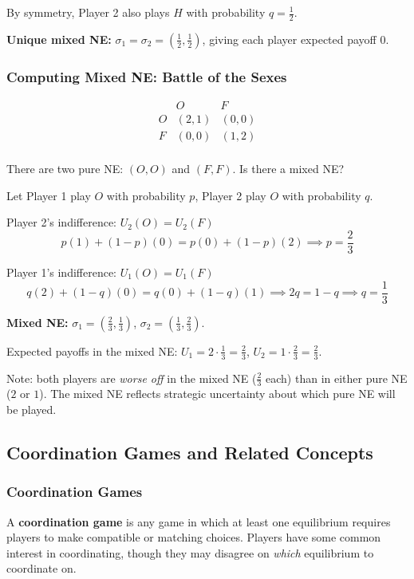 \documentclass[hidelinks]{article}
\begin{document}
By symmetry, Player 2 also plays $H$ with probability $q = \frac{1}{2}$.

\textbf{Unique mixed NE:} $\sigma_1 = \sigma_2 = (\frac{1}{2}, \frac{1}{2})$, giving each player expected payoff $0$.

\subsubsection{Computing Mixed NE: Battle of the Sexes}

\[
\begin{array}{c|cc}
 & O & F \\
\hline
O & (2,1) & (0,0) \\
F & (0,0) & (1,2) \\
\end{array}
\]

There are two pure NE: $(O,O)$ and $(F,F)$. Is there a mixed NE?

Let Player 1 play $O$ with probability $p$, Player 2 play $O$ with probability $q$.

Player 2's indifference: $U_2(O) = U_2(F)$
\[
p(1) + (1-p)(0) = p(0) + (1-p)(2) \implies p = \frac{2}{3}
\]

Player 1's indifference: $U_1(O) = U_1(F)$
\[
q(2) + (1-q)(0) = q(0) + (1-q)(1) \implies 2q = 1-q \implies q = \frac{1}{3}
\]

\textbf{Mixed NE:} $\sigma_1 = (\frac{2}{3}, \frac{1}{3})$, $\sigma_2 = (\frac{1}{3}, \frac{2}{3})$.

Expected payoffs in the mixed NE: $U_1 = 2 \cdot \frac{1}{3} = \frac{2}{3}$, $U_2 = 1 \cdot \frac{2}{3} = \frac{2}{3}$.

Note: both players are \textit{worse off} in the mixed NE ($\frac{2}{3}$ each) than in either pure NE ($2$ or $1$). The mixed NE reflects strategic uncertainty about which pure NE will be played.

\subsection{Coordination Games and Related Concepts}

\subsubsection{Coordination Games}

A \textbf{coordination game} is any game in which at least one equilibrium requires players to make compatible or matching choices. Players have some common interest in coordinating, though they may disagree on \textit{which} equilibrium to coordinate on.
\end{document}
